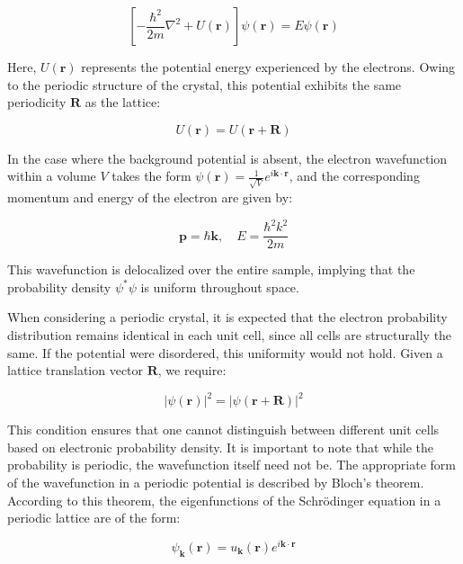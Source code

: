 \begin{equation*}
	\left[-\frac{\hbar^2}{2m} \nabla^2 + U(\mathbf{r})\right] \psi(\mathbf{r}) = E \psi(\mathbf{r})
\end{equation*}

Here, \( U(\mathbf{r}) \) represents the potential energy experienced by the electrons. Owing to the periodic structure of the crystal, this potential exhibits the same periodicity \( \mathbf{R} \) as the lattice:

\begin{equation*}
	U(\mathbf{r}) = U(\mathbf{r} + \mathbf{R})
\end{equation*}

In the case where the background potential is absent, the electron wavefunction within a volume \( V \) takes the form \( \psi(\mathbf{r}) = \frac{1}{\sqrt{V}} e^{i\mathbf{k} \cdot \mathbf{r}} \), and the corresponding momentum and energy of the electron are given by:

\begin{equation*}
	\mathbf{p} = \hbar \mathbf{k}, \quad E = \frac{\hbar^2 k^2}{2m}
\end{equation*}

This wavefunction is delocalized over the entire sample, implying that the probability density \( \psi^* \psi \) is uniform throughout space.

When considering a periodic crystal, it is expected that the electron probability distribution remains identical in each unit cell, since all cells are structurally the same. If the potential were disordered, this uniformity would not hold. Given a lattice translation vector \( \mathbf{R} \), we require:

\begin{equation*}
	|\psi(\mathbf{r})|^2 = |\psi(\mathbf{r} + \mathbf{R})|^2
\end{equation*}

This condition ensures that one cannot distinguish between different unit cells based on electronic probability density. It is important to note that while the probability is periodic, the wavefunction itself need not be. The appropriate form of the wavefunction in a periodic potential is described by Bloch’s theorem. According to this theorem, the eigenfunctions of the Schrödinger equation in a periodic lattice are of the form:

\begin{equation*}
	\psi_{\mathbf{k}}(\mathbf{r}) = u_{\mathbf{k}}(\mathbf{r}) e^{i\mathbf{k} \cdot \mathbf{r}}
\end{equation*}

